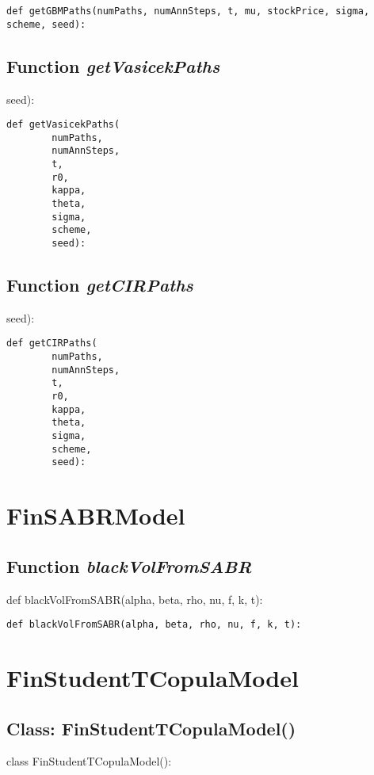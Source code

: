 \documentclass[twoside,11pt]{book}
\begin{document}
\begin{lstlisting}
def getGBMPaths(numPaths, numAnnSteps, t, mu, stockPrice, sigma, scheme, seed):
\end{lstlisting}

\subsection{Function {\it getVasicekPaths}}
seed):

\begin{lstlisting}
def getVasicekPaths(
        numPaths,
        numAnnSteps,
        t,
        r0,
        kappa,
        theta,
        sigma,
        scheme,
        seed):
\end{lstlisting}

\subsection{Function {\it getCIRPaths}}
seed):

\begin{lstlisting}
def getCIRPaths(
        numPaths,
        numAnnSteps,
        t,
        r0,
        kappa,
        theta,
        sigma,
        scheme,
        seed):
\end{lstlisting}

\newpage
\section{FinSABRModel}

\subsection{Function {\it blackVolFromSABR}}
def blackVolFromSABR(alpha, beta, rho, nu, f, k, t):

\begin{lstlisting}
def blackVolFromSABR(alpha, beta, rho, nu, f, k, t):
\end{lstlisting}

\newpage
\section{FinStudentTCopulaModel}

\subsection{Class: FinStudentTCopulaModel()}
class FinStudentTCopulaModel():
\end{document}
